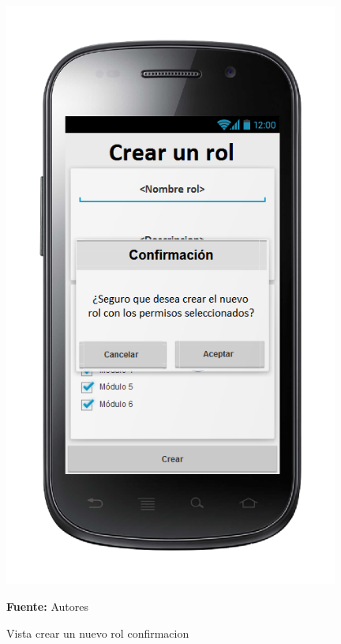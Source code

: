 \begin{figure}[!htb]
  \begin{center}
\includegraphics[width=11cm]{./imagenes/UI/Administracion/crear_un_nuevo_rol_confirmacion.png}
    \caption{Vista crear un nuevo rol confirmacion}
    \label{fig:Vista_crear_un_nuevo_rol_confirmacion}
    \textbf{Fuente:}  Autores
  \end{center}
\end{figure}
